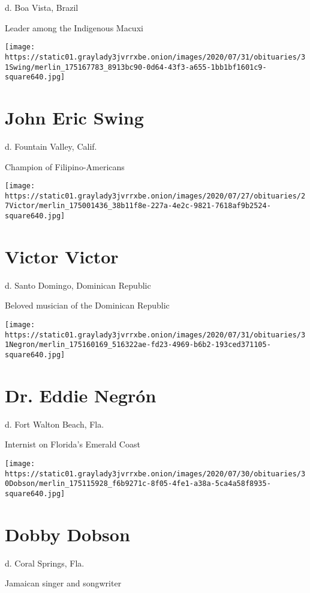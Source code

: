 d. Boa Vista, Brazil

Leader among the Indigenous Macuxi

\texttt{[image: https://static01.graylady3jvrrxbe.onion/images/2020/07/31/obituaries/31Swing/merlin\_175167783\_8913bc90-0d64-43f3-a655-1bb1bf1601c9-square640.jpg]}

\hypertarget{john-eric-swing}{%
\section{John Eric Swing}\label{john-eric-swing}}

d. Fountain Valley, Calif.

Champion of Filipino-Americans

\texttt{[image: https://static01.graylady3jvrrxbe.onion/images/2020/07/27/obituaries/27Victor/merlin\_175001436\_38b11f8e-227a-4e2c-9821-7618af9b2524-square640.jpg]}

\hypertarget{victor-victor}{%
\section{Victor Victor}\label{victor-victor}}

d. Santo Domingo, Dominican Republic

Beloved musician of the Dominican Republic

\texttt{[image: https://static01.graylady3jvrrxbe.onion/images/2020/07/31/obituaries/31Negron/merlin\_175160169\_516322ae-fd23-4969-b6b2-193ced371105-square640.jpg]}

\hypertarget{dr-eddie-negruxf3n}{%
\section{Dr. Eddie Negrón}\label{dr-eddie-negruxf3n}}

d. Fort Walton Beach, Fla.

Internist on Florida's Emerald Coast

\texttt{[image: https://static01.graylady3jvrrxbe.onion/images/2020/07/30/obituaries/30Dobson/merlin\_175115928\_f6b9271c-8f05-4fe1-a38a-5ca4a58f8935-square640.jpg]}

\hypertarget{dobby-dobson}{%
\section{Dobby Dobson}\label{dobby-dobson}}

d. Coral Springs, Fla.

Jamaican singer and songwriter

